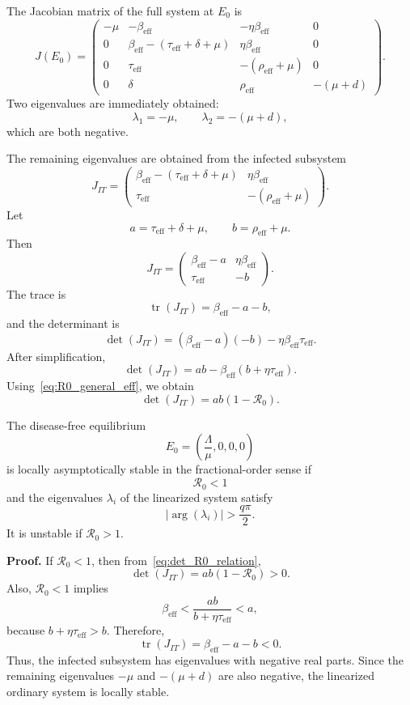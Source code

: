 \documentclass[12pt,a4paper,oneside]{report}
\newcommand{\Rzero}{\mathcal{R}_0}
\newcommand{\beff}{\beta_{\mathrm{eff}}}
\newcommand{\taueff}{\tau_{\mathrm{eff}}}
\newcommand{\rhoeff}{\rho_{\mathrm{eff}}}
\begin{document}
The Jacobian matrix of the full system at $E_0$ is
\[
J(E_0)=
\begin{pmatrix}
-\mu & -\beff & -\eta\beff & 0\\
0 & \beff-(\taueff+\delta+\mu) & \eta\beff & 0\\
0 & \taueff & -(\rhoeff+\mu) & 0\\
0 & \delta & \rhoeff & -(\mu+d)
\end{pmatrix}.
\]
Two eigenvalues are immediately obtained:
\[
\lambda_1=-\mu,
\qquad
\lambda_2=-(\mu+d),
\]
which are both negative.

The remaining eigenvalues are obtained from the infected subsystem
\[
J_{IT}=
\begin{pmatrix}
\beff-(\taueff+\delta+\mu) & \eta\beff\\
\taueff & -(\rhoeff+\mu)
\end{pmatrix}.
\]
Let
\[
a=\taueff+\delta+\mu,
\qquad
b=\rhoeff+\mu.
\]
Then
\[
J_{IT}=
\begin{pmatrix}
\beff-a & \eta\beff\\
\taueff & -b
\end{pmatrix}.
\]
The trace is
\[
\operatorname{tr}(J_{IT})=\beff-a-b,
\]
and the determinant is
\[
\det(J_{IT})
=
(\beff-a)(-b)-\eta\beff\taueff.
\]
After simplification,
\begin{equation}
\det(J_{IT})
=
ab-\beff(b+\eta\taueff).
\label{eq:det_simplified}
\end{equation}
Using~\eqref{eq:R0_general_eff}, we obtain
\begin{equation}
\det(J_{IT})=ab(1-\Rzero).
\label{eq:det_R0_relation}
\end{equation}

\begin{resultbox}[title={Theorem 4.4 --- Fractional Local Stability of $E_0$}]
The disease-free equilibrium
\[
E_0=\left(\frac{\Lambda}{\mu},0,0,0\right)
\]
is locally asymptotically stable in the fractional-order sense if
\[
\Rzero<1
\]
and the eigenvalues $\lambda_i$ of the linearized system satisfy
\[
|\arg(\lambda_i)|>\frac{q\pi}{2}.
\]
It is unstable if $\Rzero>1$.
\end{resultbox}

\noindent\textbf{Proof.}
If $\Rzero<1$, then from~\eqref{eq:det_R0_relation},
\[
\det(J_{IT})=ab(1-\Rzero)>0.
\]
Also, $\Rzero<1$ implies
\[
\beff < \frac{ab}{b+\eta\taueff}<a,
\]
because $b+\eta\taueff>b$. Therefore,
\[
\operatorname{tr}(J_{IT})=\beff-a-b<0.
\]
Thus, the infected subsystem has eigenvalues with negative real parts. Since the remaining eigenvalues $-\mu$ and $-(\mu+d)$ are also negative, the linearized ordinary system is locally stable.
\end{document}
